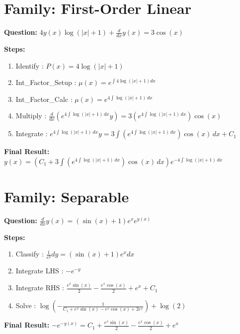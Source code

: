 \documentclass{article}
\begin{document}
\section*{Family: First-Order Linear}
\textbf{Question:} $4 y{\left(x \right)} \log{\left(\left|{x}\right| + 1 \right)} + \frac{d}{d x} y{\left(x \right)} = 3 \cos{\left(x \right)}$

\textbf{Steps:}
\begin{enumerate}
\item Identify :  $P(x) = 4 \log{\left(\left|{x}\right| + 1 \right)}$
\item Int_Factor_Setup :  $\mu(x) = e^{\int 4 \log{\left(\left|{x}\right| + 1 \right)} dx}$
\item Int_Factor_Calc :  $\mu(x) = e^{4 \int \log{\left(\left|{x}\right| + 1 \right)}\, dx}$
\item Multiply :  $\frac{d}{dx}(e^{4 \int \log{\left(\left|{x}\right| + 1 \right)}\, dx}y) = 3 \left(e^{4 \int \log{\left(\left|{x}\right| + 1 \right)}\, dx}\right) \cos{\left(x \right)}$
\item Integrate :  $e^{4 \int \log{\left(\left|{x}\right| + 1 \right)}\, dx}y = 3 \int \left(e^{4 \int \log{\left(\left|{x}\right| + 1 \right)}\, dx}\right) \cos{\left(x \right)}\, dx + C_1$
\end{enumerate}
\textbf{Final Result:} $y{\left(x \right)} = \left(C_{1} + 3 \int \left(e^{4 \int \log{\left(\left|{x}\right| + 1 \right)}\, dx}\right) \cos{\left(x \right)}\, dx\right) e^{- 4 \int \log{\left(\left|{x}\right| + 1 \right)}\, dx}$

\section*{Family: Separable}
\textbf{Question:} $\frac{d}{d x} y{\left(x \right)} = \left(\sin{\left(x \right)} + 1\right) e^{x} e^{y{\left(x \right)}}$

\textbf{Steps:}
\begin{enumerate}
\item Classify :  $\frac{1}{e^{y}} dy = \left(\sin{\left(x \right)} + 1\right) e^{x} dx$
\item Integrate LHS :  $- e^{- y}$
\item Integrate RHS :  $\frac{e^{x} \sin{\left(x \right)}}{2} - \frac{e^{x} \cos{\left(x \right)}}{2} + e^{x} + C_1$
\item Solve :  $\log{\left(- \frac{1}{C_{1} + e^{x} \sin{\left(x \right)} - e^{x} \cos{\left(x \right)} + 2 e^{x}} \right)} + \log{\left(2 \right)}$
\end{enumerate}
\textbf{Final Result:} $- e^{- y{\left(x \right)}} = C_{1} + \frac{e^{x} \sin{\left(x \right)}}{2} - \frac{e^{x} \cos{\left(x \right)}}{2} + e^{x}$
\end{document}
